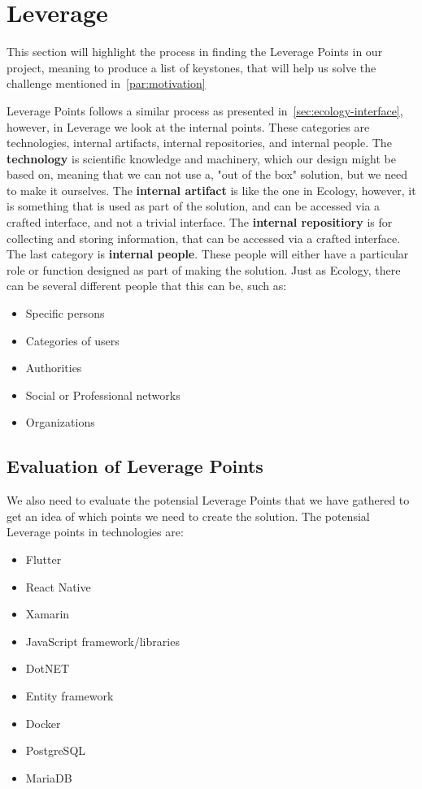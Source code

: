 \section{Leverage}\label{sec:leverage}
This section will highlight the process in finding the Leverage Points in our project, meaning to produce a list of keystones, that will help us solve the challenge mentioned in~\autoref{par:motivation}

Leverage Points follows a similar process as presented in~\autoref{sec:ecology-interface}, however, in Leverage we look at the internal points.
These categories are technologies, internal artifacts, internal repositories, and internal people.
The \textbf{technology} is scientific knowledge and machinery, which our design might be based on, meaning that we can not use a, "out of the box" solution, but we need to make it ourselves.
The \textbf{internal artifact} is like the one in Ecology, however, it is something that is used as part of the solution, and can be accessed via a crafted interface, and not a trivial interface.
The \textbf{internal repositiory} is for collecting and storing information, that can be accessed via a crafted interface.
The last category is \textbf{internal people}.
These people will either have a particular role or function designed as part of making the solution.
Just as Ecology, there can be several different people that this can be, such as:

\begin{itemize}
    \item Specific persons
    \item Categories of users
    \item Authorities
    \item Social or Professional networks
    \item Organizations
\end{itemize}

\subsection{Evaluation of Leverage Points}
We also need to evaluate the potensial Leverage Points that we have gathered to get an idea of which points we need to create the solution.
The potensial Leverage points in technologies are:

\begin{itemize}
    \item Flutter
    \item React Native
    \item Xamarin
    \item JavaScript framework/libraries
    \item DotNET
    \item Entity framework
    \item Docker
    \item PostgreSQL
    \item MariaDB
\end{itemize}

